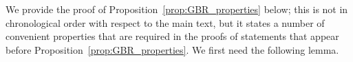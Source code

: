 \documentclass[twoside,11pt]{article}
\newcommand{\lexp}{\underline{\mathbb{E}}_{\rateset,\mathcal{M}}}
\newcommand{\rateset}{\mathcal{Q}}
\newcommand{\abs}[1]{\left\vert #1 \right\vert}
\begin{document}
%

We provide the proof of Proposition~\ref{prop:GBR_properties} below; this is not in chronological order with respect to the main text, but it states a number of convenient properties that are required in the proofs of statements that appear before Proposition~\ref{prop:GBR_properties}. We first need the following lemma.
\end{document}
